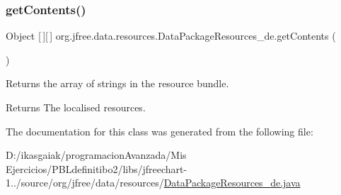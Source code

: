 \subsubsection{\texorpdfstring{get\+Contents()}{getContents()}}
{\footnotesize\ttfamily Object \mbox{[}$\,$\mbox{]}\mbox{[}$\,$\mbox{]} org.\+jfree.\+data.\+resources.\+Data\+Package\+Resources\+\_\+de.\+get\+Contents (\begin{DoxyParamCaption}{ }\end{DoxyParamCaption})}

Returns the array of strings in the resource bundle.

\begin{DoxyReturn}{Returns}
The localised resources. 
\end{DoxyReturn}


The documentation for this class was generated from the following file\+:\begin{DoxyCompactItemize}
\item 
D\+:/ikasgaiak/programacion\+Avanzada/\+Mis Ejercicios/\+P\+B\+Ldefinitibo2/libs/jfreechart-\/1../source/org/jfree/data/resources/\mbox{\hyperlink{_data_package_resources__de_8java}{Data\+Package\+Resources\+\_\+de.\+java}}\end{DoxyCompactItemize}
